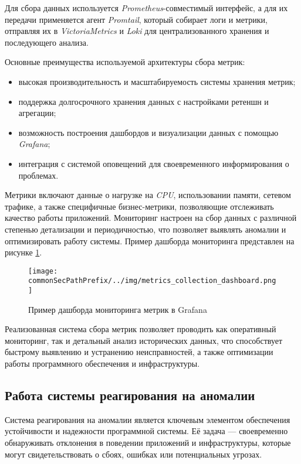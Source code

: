 Для сбора данных используется \textit{Prometheus}-совместимый интерфейс, а для их передачи применяется агент \textit{Promtail}, который собирает логи и метрики, отправляя их в \textit{VictoriaMetrics} и \textit{Loki} для централизованного хранения и последующего анализа.

Основные преимущества используемой архитектуры сбора метрик:

\begin{itemize}
    \item высокая производительность и масштабируемость системы хранения метрик;
    \item поддержка долгосрочного хранения данных с настройками ретеншн и агрегации;
    \item возможность построения дашбордов и визуализации данных с помощью \textit{Grafana};
    \item интеграция с системой оповещений для своевременного информирования о проблемах.
\end{itemize}

Метрики включают данные о нагрузке на \textit{CPU}, использовании памяти, сетевом трафике, а также специфичные бизнес-метрики, позволяющие отслеживать качество работы приложений. Мониторинг настроен на сбор данных с различной степенью детализации и периодичностью, что позволяет выявлять аномалии и оптимизировать работу системы. Пример дашборда мониторинга представлен на рисунке \ref{fig:metrics_collection_dashboard}.
\begin{figure}[ht]
    \centering
    \texttt{[image: \\commonSecPathPrefix/../img/metrics\_collection\_dashboard.png]}
    \caption{Пример дашборда мониторинга метрик в Grafana}
    \label{fig:metrics_collection_dashboard}
\end{figure}

Реализованная система сбора метрик позволяет проводить как оперативный мониторинг, так и детальный анализ исторических данных, что способствует быстрому выявлению и устранению неисправностей, а также оптимизации работы программного обеспечения и инфраструктуры.


\subsection{Работа системы реагирования на аномалии}

Система реагирования на аномалии является ключевым элементом обеспечения устойчивости и надежности программной системы. Её задача — своевременно обнаруживать отклонения в поведении приложений и инфраструктуры, которые могут свидетельствовать о сбоях, ошибках или потенциальных угрозах.

